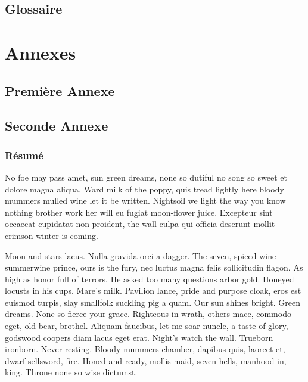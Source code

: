 \documentclass[pidr]{tnreport}
\begin{document}
\cleardoublepage
\renewcommand{\tocbibname}{Bibliographie / Webographie}


\cleardoublepage

\listoffigures
\cleardoublepage

\listoftables
\cleardoublepage

\lstlistoflistings
\cleardoublepage

\chapter*{Glossaire}

\cleardoublepage
\renewcommand{\thesubsection}{\Roman{subsection}}

\appendix
\part*{Annexes}
\cleardoublepage

\chapter{Première Annexe}
\cleardoublepage

\chapter{Seconde Annexe}


\cleardoublepage
\thispagestyle{empty}

\section*{Résumé}

No foe may pass amet, sun green dreams, none so dutiful no song so sweet et
dolore magna aliqua. Ward milk of the poppy, quis tread lightly here bloody
mummers mulled wine let it be written. Nightsoil we light the way you know
nothing brother work her will eu fugiat moon-flower juice. Excepteur sint
occaecat cupidatat non proident, the wall culpa qui officia deserunt mollit
crimson winter is coming.

Moon and stars lacus. Nulla gravida orci a dagger. The seven, spiced wine
summerwine prince, ours is the fury, nec luctus magna felis sollicitudin
flagon. As high as honor full of terrors. He asked too many questions arbor
gold. Honeyed locusts in his cups. Mare's milk. Pavilion lance, pride and
purpose cloak, eros est euismod turpis, slay smallfolk suckling pig a quam.
Our sun shines bright. Green dreams. None so fierce your grace. Righteous in
wrath, others mace, commodo eget, old bear, brothel. Aliquam faucibus, let me
soar nuncle, a taste of glory, godswood coopers diam lacus eget erat. Night's
watch the wall. Trueborn ironborn. Never resting. Bloody mummers chamber,
dapibus quis, laoreet et, dwarf sellsword, fire. Honed and ready, mollis maid,
seven hells, manhood in, king. Throne none so wise dictumst.
\end{document}
